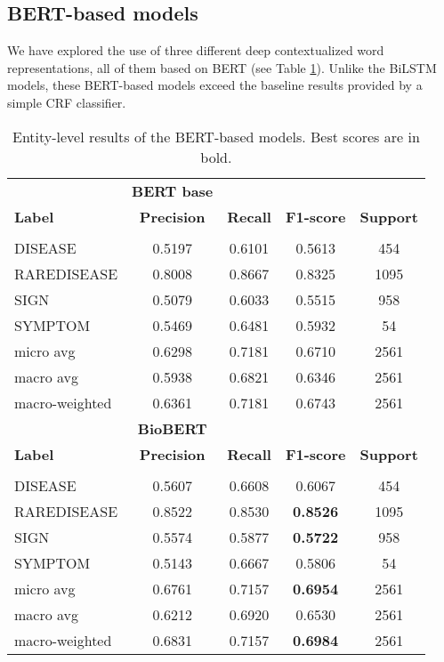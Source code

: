 \documentclass[preprint,12pt]{elsarticle}
\begin{document}
\subsection{BERT-based models}
We have explored the use of three different deep contextualized word representations, all of them based on BERT (see Table \ref{tab:bert}). Unlike the BiLSTM models, these BERT-based models exceed the baseline results provided by a simple CRF classifier. 

\begin{table}[!htbp]
\centering
\small
\caption{\label{tab:bert}Entity-level results of the BERT-based models. Best scores are in bold.}
\begin{tabular}{lcccc}
\\
& \multicolumn{1}{c}{\textbf{BERT base}} \\
{\bf Label} & {\bf Precision} &
{\bf Recall} &
{\bf F1-score} & {\bf Support} \\
\hline\\[-8pt]
DISEASE & 0.5197    &0.6101 & 0.5613 & 454\\
RAREDISEASE & 0.8008 & 0.8667 & 0.8325 & 1095\\
SIGN & 0.5079 & 0.6033 & 0.5515 & 958\\
SYMPTOM & 0.5469 & 0.6481 & 0.5932 & 54\\

micro avg & 0.6298 & 0.7181 & 0.6710 & 2561\\
macro avg & 0.5938 & 0.6821 & 0.6346 & 2561\\
macro-weighted & 0.6361 & 0.7181 & 0.6743 & 2561\\

\hline

& \multicolumn{1}{c}{\textbf{BioBERT}} \\
{\bf Label} & {\bf Precision} &
{\bf Recall} &
{\bf F1-score} & {\bf Support} \\
\hline\\[-8pt]
DISEASE & 0.5607 & 0.6608 & 0.6067 & 454\\
RAREDISEASE & 0.8522 & 0.8530 & \bf 0.8526 & 1095\\
SIGN & 0.5574 & 0.5877 & \bf 0.5722 & 958 \\
SYMPTOM & 0.5143 & 0.6667 & 0.5806 & 54 \\

micro avg & 0.6761 & 0.7157 & \bf 0.6954 & 2561\\
macro avg & 0.6212 & 0.6920 & 0.6530 & 2561\\
macro-weighted & 0.6831 & 0.7157 & \bf 0.6984 & 2561\\



\end{tabular}
\end{table}
\end{document}
